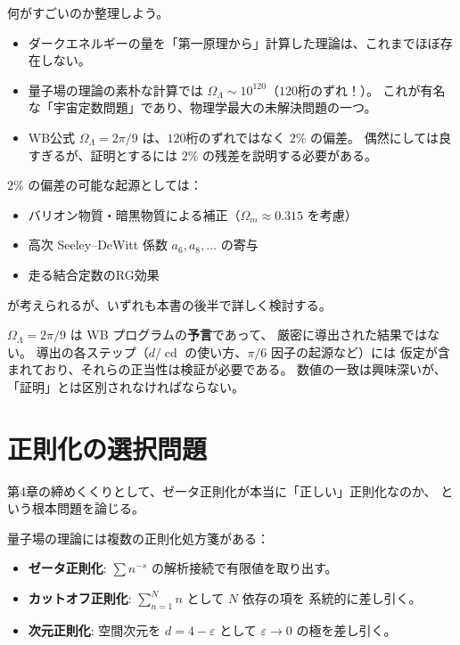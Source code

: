 \documentclass[11pt,a4paper]{article}
\theoremstyle{definition}
\newcommand{\cd}{\operatorname{cd}}
\begin{document}
\begin{hsbox}
何がすごいのか整理しよう。
\begin{itemize}
  \item ダークエネルギーの量を「第一原理から」計算した理論は、これまでほぼ存在しない。
  \item 量子場の理論の素朴な計算では $\Omega_\Lambda \sim 10^{120}$（$120$桁のずれ！）。
        これが有名な「宇宙定数問題」であり、物理学最大の未解決問題の一つ。
  \item WB公式 $\Omega_\Lambda = 2\pi/9$ は、$120$桁のずれではなく $2\%$ の偏差。
        偶然にしては良すぎるが、証明とするには $2\%$ の残差を説明する必要がある。
\end{itemize}
\end{hsbox}

$2\%$ の偏差の可能な起源としては：
\begin{itemize}
  \item バリオン物質・暗黒物質による補正（$\Omega_m \approx 0.315$ を考慮）
  \item 高次 Seeley--DeWitt 係数 $a_6, a_8, \ldots$ の寄与
  \item 走る結合定数のRG効果
\end{itemize}
が考えられるが、いずれも本書の後半で詳しく検討する。

\begin{hypbox}[注意: 仮説の地位]
$\Omega_\Lambda = 2\pi/9$ は WB プログラムの\textbf{予言}であって、
厳密に導出された結果ではない。
導出の各ステップ（$d/\cd$ の使い方、$\pi/6$ 因子の起源など）には
仮定が含まれており、それらの正当性は検証が必要である。
数値の一致は興味深いが、「証明」とは区別されなければならない。
\end{hypbox}

\section{正則化の選択問題}
\label{sec:4.5}

第4章の締めくくりとして、ゼータ正則化が本当に「正しい」正則化なのか、
という根本問題を論じる。

量子場の理論には複数の正則化処方箋がある：
\begin{itemize}
  \item \textbf{ゼータ正則化}: $\sum n^{-s}$ の解析接続で有限値を取り出す。
  \item \textbf{カットオフ正則化}: $\sum_{n=1}^{N} n$ として $N$ 依存の項を
        系統的に差し引く。
  \item \textbf{次元正則化}: 空間次元を $d = 4-\varepsilon$ として
        $\varepsilon\to 0$ の極を差し引く。
\end{itemize}
\end{document}
